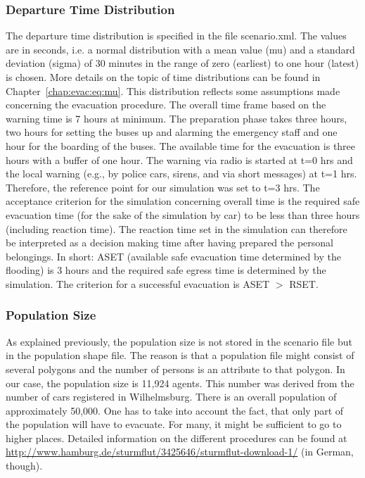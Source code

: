 \subsubsection{Departure Time Distribution}
The departure time distribution is specified in the file scenario.xml. The values are in seconds, i.e. a normal distribution with a mean value (mu) and a standard deviation (sigma) of 30 minutes in the range of zero (earliest) to one hour (latest) is chosen. 
More details on the topic of time distributions can be found in Chapter~\ref{chap:evac:eq:mu}. This distribution reflects some assumptions made concerning the evacuation procedure. The overall time frame based on the warning time is 7 hours at minimum. The preparation phase takes three hours, two hours for setting the buses up and alarming the emergency staff and one hour for the boarding of the buses. The available time for the evacuation is three hours with a buffer of one hour. 
The warning via radio is started at t=0 hrs and the local warning (e.g., by police cars, sirens, and via short messages) at t=1 hrs. Therefore, the reference point for our simulation was set to t=3 hrs. The acceptance criterion for the simulation concerning overall time is the required safe evacuation time (for the sake of the simulation by car) to be less than three hours (including reaction time). The reaction time set in the simulation can therefore be interpreted as a decision making time after having prepared the personal belongings. In short: ASET (available safe evacuation time determined by the flooding) is 3 hours and the required safe egress time is determined by the simulation. The criterion for a successful evacuation is ASET $>$ RSET.

\subsubsection{Population Size}
As explained previously, the population size is not stored in the scenario file but in the population shape file. The reason is that a population file might consist of several polygons and the number of persons is an attribute to that polygon. In our case, the population size is 11,924 agents. This number was derived from the number of cars registered in Wilhelmsburg. There is an overall population of approximately 50,000. One has to take into account the fact, that only part of the population will have to evacuate. For many, it might be sufficient to go to higher places. Detailed information on the different procedures can be found at \url{http://www.hamburg.de/sturmflut/3425646/sturmflut-download-1/} (in German, though).

